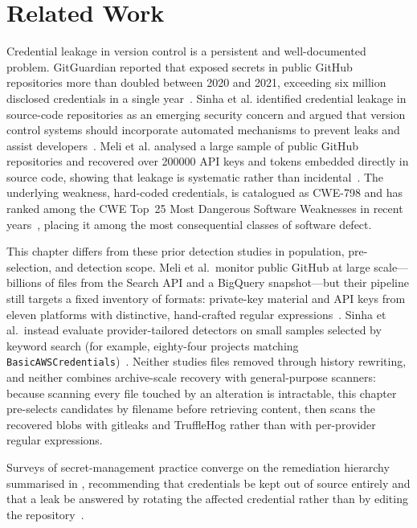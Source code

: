 \section{Related Work}
\label{sec:sec-related}

Credential leakage in version control is a persistent and well-documented problem.
GitGuardian reported that exposed secrets in public GitHub repositories more than doubled between 2020 and 2021, exceeding six million disclosed credentials in a single year~\cite{segura2022secrets}.
Sinha et al. identified credential leakage in source-code repositories as an emerging security concern and argued that version control systems should incorporate automated mechanisms to prevent leaks and assist developers~\cite{DBLP:conf/msr/SinhaSDPM15}.
Meli et al. analysed a large sample of public GitHub repositories and recovered over \num{200000} API keys and tokens embedded directly in source code, showing that leakage is systematic rather than incidental~\cite{DBLP:conf/ndss/MeliMR19}.
The underlying weakness, hard-coded credentials, is catalogued as CWE-798 and has ranked among the CWE Top~25 Most Dangerous Software Weaknesses in recent years~\cite{cwe798,cwe_top25_2023}, placing it among the most consequential classes of software defect.

This chapter differs from these prior detection studies in population, pre-selection, and detection scope.
Meli et al.\ monitor public GitHub at large scale---billions of files from the Search API and a BigQuery snapshot---but their pipeline still targets a fixed inventory of formats: private-key material and API keys from eleven platforms with distinctive, hand-crafted regular expressions~\cite{DBLP:conf/ndss/MeliMR19}.
Sinha et al.\ instead evaluate provider-tailored detectors on small samples selected by keyword search (for example, eighty-four projects matching \texttt{BasicAWSCredentials})~\cite{DBLP:conf/msr/SinhaSDPM15}.
Neither studies files removed through history rewriting, and neither combines archive-scale recovery with general-purpose scanners: because scanning every file touched by an alteration is intractable, this chapter pre-selects candidates by filename before retrieving content, then scans the recovered blobs with gitleaks and TruffleHog rather than with per-provider regular expressions.

Surveys of secret-management practice converge on the remediation hierarchy summarised in , recommending that credentials be kept out of source entirely and that a leak be answered by rotating the affected credential rather than by editing the repository~\cite{DBLP:conf/secdev/BasakNRW22, DBLP:journals/corr/abs-2211-06213}.

